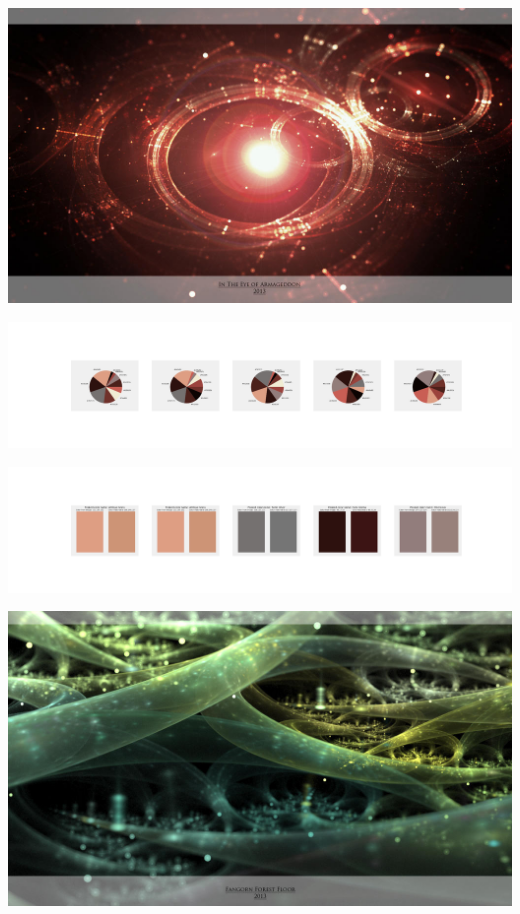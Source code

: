 \documentclass[11pt]{article}
\begin{document}
\begin{landscape}
    \begin{center}
    \includegraphics[width=\textwidth]{./nbimg/file (88).jpg}
    \end{center}

    \begin{center}
    \includegraphics[width=250mm]{./nbimg/pie-438.jpg}
    \end{center}

    \begin{center}
    \includegraphics[width=250mm]{./nbimg/peak-438.jpg}
    \end{center}
    

    \begin{center}
    \includegraphics[width=\textwidth]{./nbimg/file (89).jpg}
    \end{center}


\end{landscape}
\end{document}
